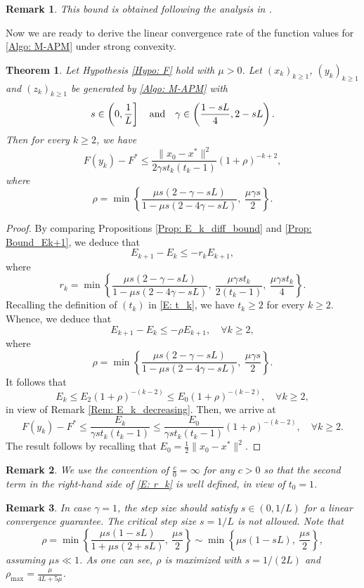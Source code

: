 \documentclass[pdflatex,sn-mathphys-num]{sn-jnl}
\theoremstyle{thmstyleone}
\newtheorem{theorem}{Theorem}
\theoremstyle{thmstyletwo}
\newtheorem{remark}{Remark}
\theoremstyle{thmstylethree}
\newcommand{\qbox}[1]{\quad\hbox{#1}\quad}
\begin{document}
\begin{remark}
This bound is obtained following the analysis in \cite{Bao_2023}.
\end{remark}

Now we are ready to derive the linear convergence rate of the function values for \eqref{Algo: M-APM} under strong convexity.

\begin{theorem}\label{Thm: rate_SC}
Let Hypothesis \ref{Hypo: F} hold with $\mu>0$. Let $(x_k)_{k\ge 1}$, $(y_k)_{k\ge 1}$ and $(z_k)_{k\ge 1}$ be generated by \eqref{Algo: M-APM} with 
$$s\in \left( 0, \frac{1}{L} \right] \qbox{and} \gamma\in\left( \frac{1-sL}{4},2-sL \right).  $$
Then for every $k\ge 2$, we have 
$$ F(y_k) - F^* \le \frac{\| x_0 - x^* \|^2}{2\gamma st_k(t_k-1)}(1+\rho)^{-k+2},$$
where
$$ \rho = \min\left\{ \frac{\mu s(2-\gamma-sL)}{ 1- \mu s(2-4\gamma-sL) },\ 
\frac{\mu\gamma s}{2}
 \right\}. $$
\end{theorem}


\begin{proof}
By comparing Propositions \ref{Prop: E_k_diff_bound} and \ref{Prop: Bound_Ek+1}, we deduce that
$$ E_{k+1} - E_k \le -r_k E_{k+1}, $$
where
\begin{equation}\label{E: r_k}
r_k = \min\left\{ \frac{\mu s(2-\gamma-sL)}{ 1- \mu s(2-4\gamma-sL) },\ 
\frac{\mu\gamma st_k}{2(t_k-1)},\ 
\frac{\mu\gamma s t_k}{4}
 \right\}.
\end{equation}
Recalling the definition of $(t_k)$ in \eqref{E: t_k}, we have $t_k\ge 2$ for every $k\ge 2$. Whence, we deduce that
$$ E_{k+1} - E_k \le -\rho E_{k+1},\quad \forall k\ge 2, $$
where
$$ \rho = \min\left\{ \frac{\mu s(2-\gamma-sL)}{ 1- \mu s(2-4\gamma-sL) },\ 
\frac{\mu\gamma s}{2}
 \right\}. $$
It follows that
$$ E_k \le E_2(1+\rho)^{-(k-2)} \le E_0(1+\rho)^{-(k-2)},\quad \forall k\ge 2, $$
in view of Remark \ref{Rem: E_k_decreasing}. Then, we arrive at 
$$ F(y_k) - F^* \le \frac{E_k}{\gamma st_k(t_k-1)} \le \frac{E_0}{\gamma st_k(t_k-1)}(1+\rho)^{-(k-2)},\quad\forall k\ge 2. $$
The result follows by recalling that $E_0 = \frac{1}{2}\| x_0 - x^* \|^2$.
\end{proof}

\begin{remark}
We use the convention of $\frac{c}{0}=\infty$ for any $c>0$ so that the second term in the right-hand side of \eqref{E: r_k} is well defined, in view of $t_0=1$. 
\end{remark}

\begin{remark}\label{Rem: rate_base_SC}
In case $\gamma=1$, the step size should satisfy $s\in(0,1/L)$ for a linear convergence guarantee. The critical step size $s=1/L$ is not allowed. Note that
$$ \rho = \min\left\{ \frac{\mu s(1-sL)}{ 1+ \mu s(2+sL) },\ 
\frac{\mu s}{2}
 \right\} 
 \sim 
 \min\left\{ \mu s(1-sL),\ 
 \frac{\mu s}{2} \right\}, $$
assuming $\mu s \ll 1$. As one can see, $\rho$ is maximized with $s=1/(2L)$ and $\rho_{\max} = \frac{\mu}{4L+5\mu}$.
\end{remark}
\end{document}
